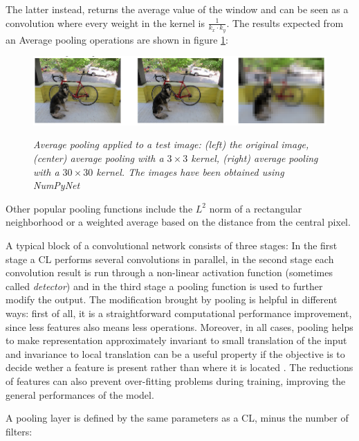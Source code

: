 \documentclass[12pt,a4paper]{report}
\begin{document}
The latter instead, returns the average value of the window and can be seen as a convolution where every weight in the kernel is $\frac{1}{k_x \cdot k_y}$.
The results expected from an Average pooling operations are shown in figure \ref{fig:avgpool:ex}:

\begin{figure}[h]
 \centering
 \includegraphics[scale=0.7]{./images/avgpool_layer.png}
 \label{fig:avgpool:ex}
 \caption{\it Average pooling applied to a test image: (left) the original image, (center) average pooling with a $3 \times 3$ kernel, (right) average pooling with a $30 \times 30$ kernel. The images have been obtained using NumPyNet}
\end{figure}

Other popular pooling functions include the $L^2$ norm of a rectangular neighborhood or a weighted average based on the distance from the central pixel.

A typical block of a convolutional network consists of three stages: In the first stage a CL performs several convolutions in parallel, in the second stage each convolution result is run through a non-linear activation function (sometimes called {\it detector}) and in the third stage a pooling function is used to further modify the output. 
The modification brought by pooling is helpful in different ways: first of all, it is a straightforward computational performance improvement, since less features also means less operations. 
Moreover, in all cases, pooling helps to make representation approximately invariant to small translation of the input and invariance to local translation can be a useful property if the objective is to decide wether a feature is present rather than where it is located \cite{Goodfellow-et-al-2016}.
The reductions of features can also prevent over-fitting problems during training, improving the general performances of the model. 

A pooling layer is defined by the same parameters as a CL, minus the number of filters:
\end{document}
